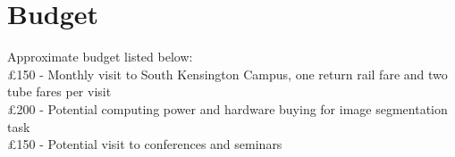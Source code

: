 \documentclass[10pt]{article}
\begin{document}
\section*{Budget}
Approximate budget listed below:\\
\pounds 150 - Monthly visit to South Kensington Campus, one return rail fare and two tube fares per visit\\
\pounds 200 - Potential computing power and hardware buying for image segmentation task\\
\pounds 150 - Potential visit to conferences and seminars 
\clearpage
\printbibliography
\end{document}
